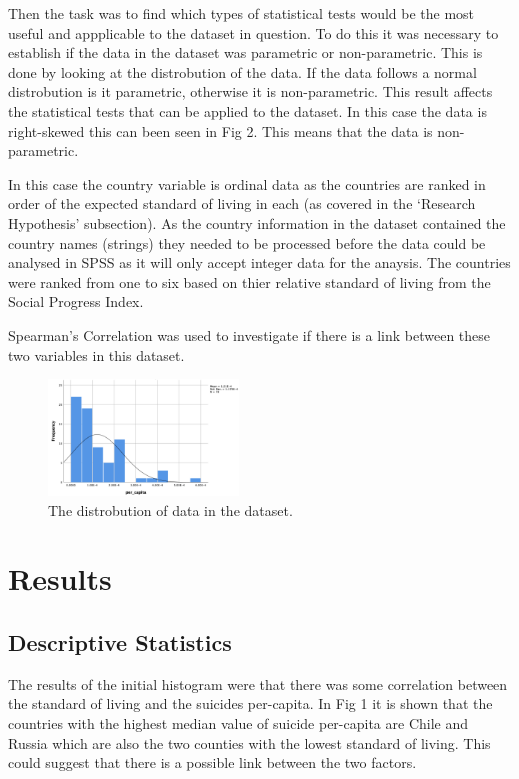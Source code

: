 \documentclass[conference]{IEEEtran}
\begin{document}
Then the task was to find which types of statistical tests would be the most useful and appplicable to the dataset in question.
To do this it was necessary to establish if the data in the dataset was parametric or non-parametric.
This is done by looking at the distrobution of the data. If the data follows a normal distrobution is it parametric, otherwise it is non-parametric.
This result affects the statistical tests that can be applied to the dataset.
In this case the data is right-skewed this can been seen in Fig 2. This means that the data is non-parametric.

In this case the country variable is ordinal data as the countries are ranked in order of the expected standard of living in each (as covered in the `Research Hypothesis' subsection).
As the country information in the dataset contained the country names (strings) they needed to be processed before the data could be analysed in SPSS as it will only accept integer data for the anaysis.
The countries were ranked from one to six based on thier relative standard of living from the Social Progress Index.

Spearman's Correlation was used to investigate if there is a link between these two variables in this dataset.

    \begin{figure}[t]
        \centering
        \includegraphics[width=0.45\textwidth]{skewed}
        \caption{The distrobution of data in the dataset.}
    \end{figure}

\section{Results}
\subsection{Descriptive Statistics}
The results of the initial histogram were that there was some correlation between the standard of living and the suicides per-capita.
In Fig 1 it is shown that the countries with the highest median value of suicide per-capita are Chile and Russia which are also the two counties with the lowest standard of living.
This could suggest that there is a possible link between the two factors.
\end{document}
